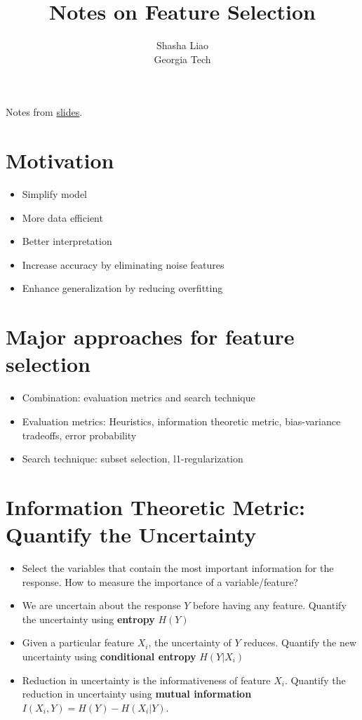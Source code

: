 \documentclass[twoside,12pt]{article}
\begin{document}
\title{Notes on Feature Selection}
\author {Shasha Liao \\ Georgia Tech}
\maketitle
Notes from \href{https://github.com/sliao7/CSE6740_Computational_Data_Analysis/blob/main/slides/feature_selection.pdf}{slides}.
\section{Motivation}
\begin{itemize}
\item Simplify model
\item More data efficient 
\item Better interpretation
\item Increase accuracy by eliminating noise features
\item Enhance generalization by reducing overfitting 
\end{itemize}

\section{Major approaches for feature selection}
\begin{itemize}
\item Combination: evaluation metrics and search technique
\item Evaluation metrics: Heuristics, information theoretic metric, bias-variance tradeoffs, error probability
\item Search technique: subset selection, l1-regularization 
\end{itemize}

\section{Information Theoretic Metric: Quantify the Uncertainty}
\begin{itemize}
\item Select the variables that contain the most important information for the response. How to measure the importance of a variable/feature?
\item We are uncertain about the response $Y$ before having any feature. Quantify the uncertainty using \textbf{entropy} $H(Y)$
\item Given a particular feature $X_i$, the uncertainty of $Y$ reduces. Quantify the new uncertainty using \textbf{conditional entropy} $H(Y|X_i)$
\item Reduction in uncertainty is the informativeness of feature $X_i$. Quantify the reduction in uncertainty using \textbf{mutual information} $I(X_i, Y) = H(Y) - H(X_i | Y)$.
\end{itemize}
\end{document}
